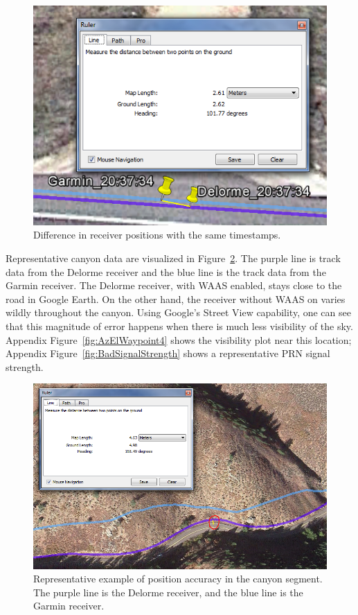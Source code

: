 \documentclass[]{aiaa-tc}%
\begin{document}
	\begin{figure}[H]
		\centering
		\includegraphics[width = 13cm]{ClockError.PNG}
		\caption{Difference in receiver positions with the same timestamps.}
		\label{fig:ClockError}
	\end{figure}
	
	\noindent Representative canyon data are visualized in Figure~\ref{fig:badPreWP4}. The purple line is track data from the Delorme receiver and the blue line is the track data from the Garmin receiver. The Delorme receiver, with WAAS enabled, stays close to the road in Google Earth. On the other hand, the receiver without WAAS on varies wildly throughout the canyon. Using Google's Street View capability, one can see that this magnitude of error happens when there is much less visibility of the sky. Appendix Figure~\ref{fig:AzElWaypoint4} shows the visibility plot near this location; Appendix Figure~\ref{fig:BadSignalStrength} shows a representative PRN signal strength.

	\begin{figure}[H]
		\centering
		\includegraphics[width = 13cm]{badPreWP4.PNG}
		\caption{Representative example of position accuracy in the canyon segment. The purple line is the Delorme receiver, and the blue line is the Garmin receiver. }
		\label{fig:badPreWP4}
	\end{figure}
\end{document}
